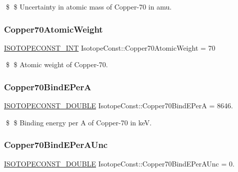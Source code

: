 \$ \$ Uncertainty in atomic mass of Copper-\/70 in amu. \mbox{\label{group___isotope_const-_copper-_cu70_gab448be06b0f3c21e5c19bd351db2edeb}} 
\subsubsection{\texorpdfstring{Copper70\+Atomic\+Weight}{Copper70AtomicWeight}}
{\footnotesize\ttfamily \mbox{\hyperlink{group___isotope_const-_macros_ga5f18360b3e99483a35c32d789e62621c}{I\+S\+O\+T\+O\+P\+E\+C\+O\+N\+S\+T\+\_\+\+I\+NT}} Isotope\+Const\+::\+Copper70\+Atomic\+Weight = 70}

\$ \$ Atomic weight of Copper-\/70. \mbox{\label{group___isotope_const-_copper-_cu70_ga080ba1163df366bde6535aa3f765bdbd}} 
\subsubsection{\texorpdfstring{Copper70\+Bind\+E\+PerA}{Copper70BindEPerA}}
{\footnotesize\ttfamily \mbox{\hyperlink{group___isotope_const-_macros_ga8f45a7272ce02c0b4c65c44636ed719a}{I\+S\+O\+T\+O\+P\+E\+C\+O\+N\+S\+T\+\_\+\+D\+O\+U\+B\+LE}} Isotope\+Const\+::\+Copper70\+Bind\+E\+PerA = 8646.}

\$ \$ Binding energy per A of Copper-\/70 in keV. \mbox{\label{group___isotope_const-_copper-_cu70_gadf4afad82d61ee312e7ac13e0d7ebff5}} 
\subsubsection{\texorpdfstring{Copper70\+Bind\+E\+Per\+A\+Unc}{Copper70BindEPerAUnc}}
{\footnotesize\ttfamily \mbox{\hyperlink{group___isotope_const-_macros_ga8f45a7272ce02c0b4c65c44636ed719a}{I\+S\+O\+T\+O\+P\+E\+C\+O\+N\+S\+T\+\_\+\+D\+O\+U\+B\+LE}} Isotope\+Const\+::\+Copper70\+Bind\+E\+Per\+A\+Unc = 0.}

